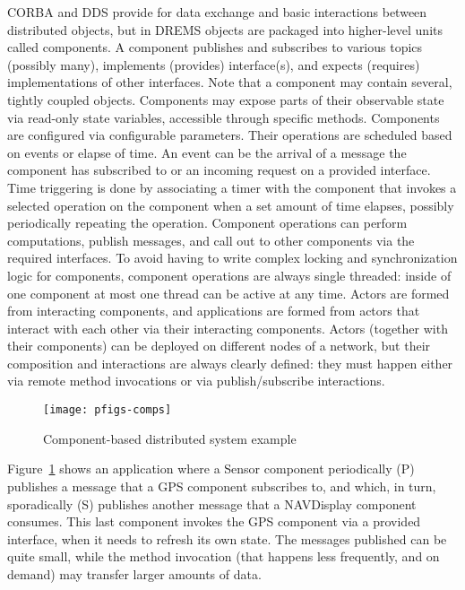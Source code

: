 CORBA and DDS provide for data exchange and basic interactions between
distributed objects, but in DREMS objects are packaged into
higher-level units called components. A component
\cite{ISIS_F6_ISORC:13} publishes and subscribes to various topics
(possibly many), implements (provides) interface(s), and expects
(requires) implementations of other interfaces. Note that a component
may contain several, tightly coupled objects.  Components may expose
parts of their observable state via read-only state variables,
accessible through specific methods. Components are configured via
configurable parameters. Their operations are
scheduled based on events or elapse of time. An event can be the
arrival of a message the component has subscribed to or an incoming
request on a provided interface. Time triggering is done by
associating a timer with the component that invokes a selected
operation on the component when a set amount of time elapses,
possibly periodically repeating the operation. Component operations
can perform computations, publish messages, and call out to other
components via the required interfaces. To avoid having to write
complex locking and synchronization logic for components, component
operations are always single threaded: inside of one component at most
one thread can be active at any time.  Actors are formed from
interacting components, and applications are formed from actors that
interact with each other via their interacting components. Actors
(together with their components) can be deployed on different nodes of
a network, but their composition and interactions are always clearly
defined: they must happen either via remote method invocations or via
publish/subscribe interactions.

\begin{figure}[t]
\centering \texttt{[image: pfigs-comps]}
\caption{Component-based distributed system example}
\label{fig:component_architecture}
\vspace{-0.1in}
\end{figure}

Figure~\ref{fig:component_architecture} shows an application where a
Sensor component periodically (P) publishes a message that a GPS
component subscribes to, and which, in turn, sporadically (S) publishes
another message that a NAVDisplay component consumes. This last
component invokes the GPS component via a provided interface, when it
needs to refresh its own state. The messages published can be quite
small, while the method invocation (that happens less frequently, and
on demand) may transfer larger amounts of data. 

